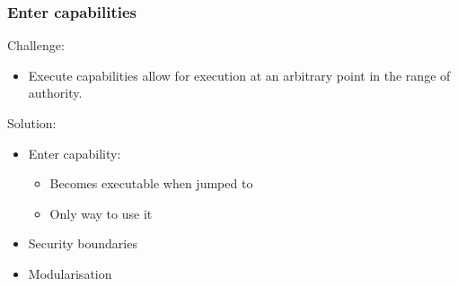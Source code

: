 \documentclass[handout]{beamer}
\begin{document}
\begin{frame}
  \frametitle{Enter capabilities}
  Challenge:
  \begin{itemize}
    \item Execute capabilities allow for execution at an arbitrary point in the
      range of authority.
  \end{itemize}
  Solution:
  \begin{itemize}
  \item Enter capability:
    \begin{itemize}
    \item Becomes executable when jumped to
    \item Only way to use it
    \end{itemize}
  \item Security boundaries
  \item Modularisation
  \end{itemize}
\end{frame}
\end{document}
